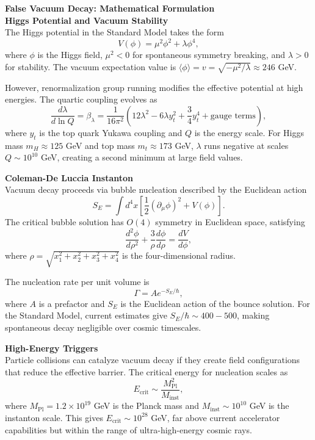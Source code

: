 \begin{technical}
{\Large\textbf{False Vacuum Decay: Mathematical Formulation}}\\[0.7em]

\textbf{Higgs Potential and Vacuum Stability}\\[0.5em]
The Higgs potential in the Standard Model takes the form
$$
V(\phi) = \mu^2 \phi^2 + \lambda \phi^4,
$$
where $\phi$ is the Higgs field, $\mu^2 < 0$ for spontaneous symmetry breaking, and $\lambda > 0$ for stability. The vacuum expectation value is $\langle \phi \rangle = v = \sqrt{-\mu^2/\lambda} \approx 246$ GeV.

However, renormalization group running modifies the effective potential at high energies. The quartic coupling evolves as
$$
\frac{d\lambda}{d\ln Q} = \beta_\lambda = \frac{1}{16\pi^2}\left(12\lambda^2 - 6\lambda y_t^2 + \frac{3}{4}y_t^4 + \text{gauge terms}\right),
$$
where $y_t$ is the top quark Yukawa coupling and $Q$ is the energy scale. For Higgs mass $m_H \approx 125$ GeV and top mass $m_t \approx 173$ GeV, $\lambda$ runs negative at scales $Q \sim 10^{10}$ GeV, creating a second minimum at large field values.

\textbf{Coleman-De Luccia Instanton}\\[0.5em]
Vacuum decay proceeds via bubble nucleation described by the Euclidean action
$$
S_E = \int d^4x \left[\frac{1}{2}(\partial_\mu \phi)^2 + V(\phi)\right].
$$
The critical bubble solution has $O(4)$ symmetry in Euclidean space, satisfying
$$
\frac{d^2\phi}{d\rho^2} + \frac{3}{\rho}\frac{d\phi}{d\rho} = \frac{dV}{d\phi},
$$
where $\rho = \sqrt{x_1^2 + x_2^2 + x_3^2 + x_4^2}$ is the four-dimensional radius.

The nucleation rate per unit volume is
$$
\Gamma = A e^{-S_E/\hbar},
$$
where $A$ is a prefactor and $S_E$ is the Euclidean action of the bounce solution. For the Standard Model, current estimates give $S_E/\hbar \sim 400-500$, making spontaneous decay negligible over cosmic timescales.

\textbf{High-Energy Triggers}\\[0.5em]
Particle collisions can catalyze vacuum decay if they create field configurations that reduce the effective barrier. The critical energy for nucleation scales as
$$
E_{\text{crit}} \sim \frac{M_{\text{Pl}}^2}{M_{\text{inst}}},
$$
where $M_{\text{Pl}} = 1.2 \times 10^{19}$ GeV is the Planck mass and $M_{\text{inst}} \sim 10^{10}$ GeV is the instanton scale. This gives $E_{\text{crit}} \sim 10^{28}$ GeV, far above current accelerator capabilities but within the range of ultra-high-energy cosmic rays.


\end{technical}
